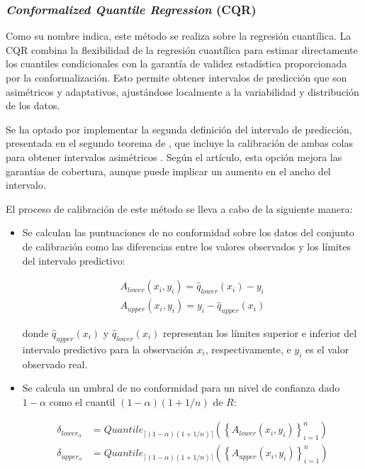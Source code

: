
\subsubsection{\textit{Conformalized Quantile Regression} (CQR)}

Como su nombre indica, este método se realiza sobre la regresión cuantílica. La \acrshort{CQR} \cite{romano2019} combina la flexibilidad de la regresión cuantílica para estimar directamente los cuantiles condicionales con la garantía de validez estadística proporcionada por la conformalización. Esto permite obtener intervalos de predicción que son asimétricos y adaptativos, ajustándose localmente a la variabilidad y distribución de los datos.

Se ha optado por implementar la segunda definición del intervalo de predicción, presentada en el segundo teorema de \cite{romano2019}, que incluye la calibración de ambas colas para obtener intervalos asimétricos \cite{linusson2014}. Según el artículo, esta opción mejora las garantías de cobertura, aunque puede implicar un aumento en el ancho del intervalo.

El proceso de calibración de este método se lleva a cabo de la siguiente manera: 

\begin{itemize}
    \item Se calculan las puntuaciones de no conformidad sobre los datos del conjunto de calibración como las diferencias entre los valores observados y los límites del intervalo predictivo:
    
    \begin{equation*}
    \begin{split}
        A_{lower}(x_i,y_i) = \hat{q}_{lower}(x_i) - y_i \\
        A_{upper}(x_i,y_i) = y_i - \hat{q}_{upper}(x_i)  
    \end{split}
    \end{equation*}

    donde $\hat{q}_{upper}(x_i)$ y $\hat{q}_{lower}(x_i)$ representan los límites superior e inferior del intervalo predictivo para la observación $x_i$, respectivamente, e $y_i$ es el valor observado real.

    \item Se calcula un umbral de no conformidad para un nivel de confianza dado $1-\alpha$ como el cuantil $(1-\alpha)(1+1/n)$ de $R$:

    \begin{equation*}
    \begin{split}
        \delta_{lower_\alpha} &= Quantile_{ \lceil  (1-\alpha) (1 + 1/n)  \rceil } ( \left\{ A_{lower}(x_i,y_i) \right\}_{i=1}^n  ) \\
        \delta_{upper_\alpha} &= Quantile_{ \lceil  (1-\alpha) (1 + 1/n)  \rceil } ( \left\{ A_{upper}(x_i,y_i) \right\}_{i=1}^n  )
    \end{split}
    \end{equation*}

\end{itemize}

